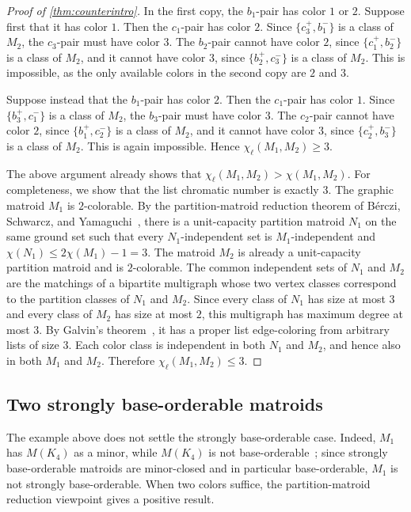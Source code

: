 \documentclass{article}
\theoremstyle{plain}
\theoremstyle{definition}
\begin{document}
\begin{proof}[Proof of \cref{thm:counterintro}]
In the first copy, the $b_1$-pair has color $1$ or $2$. Suppose first that it has color $1$. Then the $c_1$-pair has color $2$. Since $\{c_3^+,b_1^-\}$ is a class of $M_2$, the $c_3$-pair must have color $3$. The $b_2$-pair cannot have color $2$, since $\{c_1^+,b_2^-\}$ is a class of $M_2$, and it cannot have color $3$, since $\{b_2^+,c_3^-\}$ is a class of $M_2$. This is impossible, as the only available colors in the second copy are $2$ and $3$.

Suppose instead that the $b_1$-pair has color $2$. Then the $c_1$-pair has color $1$. Since $\{b_3^+,c_1^-\}$ is a class of $M_2$, the $b_3$-pair must have color $3$. The $c_2$-pair cannot have color $2$, since $\{b_1^+,c_2^-\}$ is a class of $M_2$, and it cannot have color $3$, since $\{c_2^+,b_3^-\}$ is a class of $M_2$. This is again impossible. Hence $\chi_\ell(M_1,M_2)\ge3$.

The above argument already shows that $\chi_\ell(M_1,M_2)>\chi(M_1,M_2)$. For completeness, we show that the list chromatic number is exactly $3$. The graphic matroid $M_1$ is $2$-colorable. By the partition-matroid reduction theorem of B\'erczi, Schwarcz, and Yamaguchi~\cite[Theorem~1.6]{berczi2021list}, there is a unit-capacity partition matroid $N_1$ on the same ground set such that every $N_1$-independent set is $M_1$-independent and $\chi(N_1)\le2\chi(M_1)-1=3$. The matroid $M_2$ is already a unit-capacity partition matroid and is $2$-colorable. The common independent sets of $N_1$ and $M_2$ are the matchings of a bipartite multigraph whose two vertex classes correspond to the partition classes of $N_1$ and $M_2$. Since every class of $N_1$ has size at most $3$ and every class of $M_2$ has size at most $2$, this multigraph has maximum degree at most $3$. By Galvin's theorem~\cite{galvin1995list}, it has a proper list edge-coloring from arbitrary lists of size $3$. Each color class is independent in both $N_1$ and $M_2$, and hence also in both $M_1$ and $M_2$. Therefore $\chi_\ell(M_1,M_2)\le3$.
\end{proof}

\subsection{Two strongly base-orderable matroids}
\label{sec:sbo}

The example above does not settle the strongly base-orderable case. Indeed, $M_1$ has $M(K_4)$ as a minor, while $M(K_4)$ is not base-orderable~\cite{bonin2016infinite}; since strongly base-orderable matroids are minor-closed and in particular base-orderable, $M_1$ is not strongly base-orderable. When two colors suffice, the partition-matroid reduction viewpoint gives a positive result.
\end{document}
